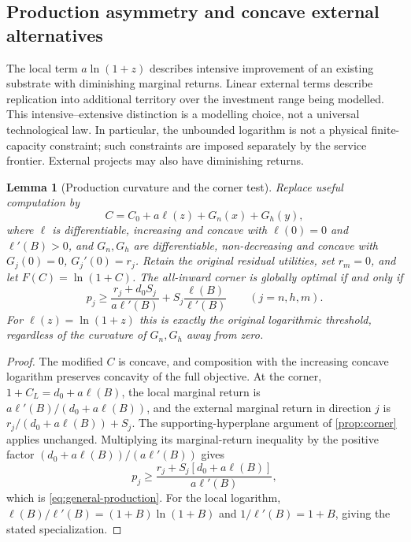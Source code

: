 \documentclass[11pt,a4paper]{article}
\newtheorem{lemma}[proposition]{Lemma}
\theoremstyle{definition}\newtheorem{definition}{Definition}
\begin{document}
\subsection{Production asymmetry and concave external alternatives}
\label{sec:production}
The local term $a\ln(1+z)$ describes intensive improvement of an existing
substrate with diminishing marginal returns. Linear external terms describe
replication into additional territory over the investment range being
modelled. This intensive--extensive distinction is a modelling choice,
not a universal technological law. In particular, the unbounded logarithm
is not a physical finite-capacity constraint; such constraints are imposed
separately by the service frontier. External projects may also have
diminishing returns.

\begin{lemma}[Production curvature and the corner test]
\label{lem:production}
Replace useful computation by
\[
 C=C_0+a\ell(z)+G_n(x)+G_h(y),
\]
where $\ell$ is differentiable, increasing and concave with $\ell(0)=0$
and $\ell'(B)>0$, and $G_n,G_h$ are differentiable, non-decreasing and
concave with $G_j(0)=0$, $G_j'(0)=r_j$. Retain the original residual
utilities, set $r_m=0$, and let $F(C)=\ln(1+C)$. The all-inward corner
is globally optimal if and only if
\begin{equation}
 p_j\geq\frac{r_j+d_0S_j}{a\ell'(B)}
            +S_j\frac{\ell(B)}{\ell'(B)}
 \qquad(j=n,h,m).
 \label{eq:general-production}
\end{equation}
For $\ell(z)=\ln(1+z)$ this is exactly the original logarithmic
threshold, regardless of the curvature of $G_n,G_h$ away from zero.
\end{lemma}
\begin{proof}
The modified $C$ is concave, and composition with the increasing concave
logarithm preserves concavity of the full objective. At the corner,
$1+C_L=d_0+a\ell(B)$, the local marginal return is
$a\ell'(B)/(d_0+a\ell(B))$, and the external marginal return in
direction $j$ is $r_j/(d_0+a\ell(B))+S_j$.
The supporting-hyperplane argument of \cref{prop:corner} applies unchanged.
Multiplying its marginal-return inequality by the positive factor
$(d_0+a\ell(B))/(a\ell'(B))$ gives
\[
 p_j\geq\frac{r_j+S_j[d_0+a\ell(B)]}{a\ell'(B)},
\]
which is \cref{eq:general-production}. For the local logarithm,
$\ell(B)/\ell'(B)=(1+B)\ln(1+B)$ and
$1/\ell'(B)=1+B$, giving the stated specialization.
\end{proof}
\end{document}
